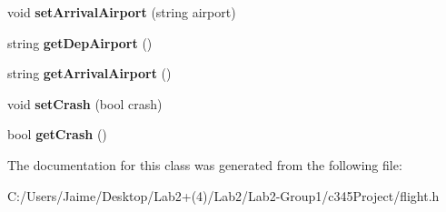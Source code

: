 \begin{DoxyCompactItemize}
\item 
\hypertarget{classflight_ab405d191d48815c5261fa308a3f9f52d}{
void {\bfseries setArrivalAirport} (string airport)}
\label{classflight_ab405d191d48815c5261fa308a3f9f52d}

\item 
\hypertarget{classflight_a6c77d09e822b234d41e912541c23fbe0}{
string {\bfseries getDepAirport} ()}
\label{classflight_a6c77d09e822b234d41e912541c23fbe0}

\item 
\hypertarget{classflight_a297a137fdea7eef0b5f4914e76b17f2d}{
string {\bfseries getArrivalAirport} ()}
\label{classflight_a297a137fdea7eef0b5f4914e76b17f2d}

\item 
\hypertarget{classflight_a824915e82d795016428ab52bdc640cb0}{
void {\bfseries setCrash} (bool crash)}
\label{classflight_a824915e82d795016428ab52bdc640cb0}

\item 
\hypertarget{classflight_a5756436645fed76efd0a8248c8349844}{
bool {\bfseries getCrash} ()}
\label{classflight_a5756436645fed76efd0a8248c8349844}

\end{DoxyCompactItemize}


The documentation for this class was generated from the following file:\begin{DoxyCompactItemize}
\item 
C:/Users/Jaime/Desktop/Lab2+(4)/Lab2/Lab2-\/Group1/c345Project/flight.h\end{DoxyCompactItemize}
